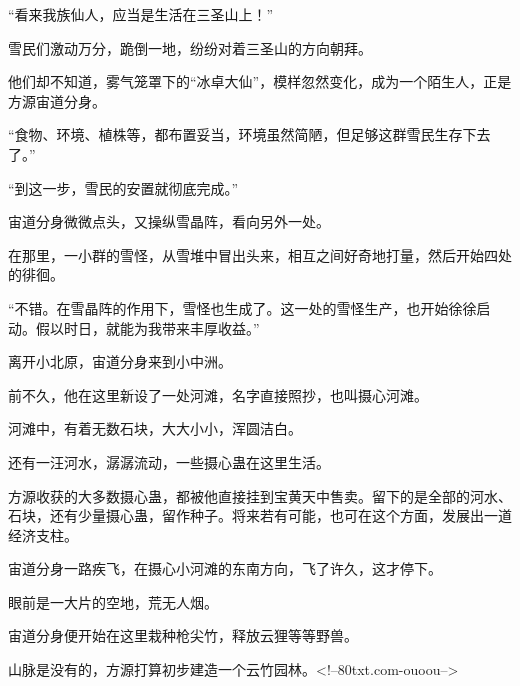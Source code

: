 \begin{this_body}
“看来我族仙人，应当是生活在三圣山上！”

雪民们激动万分，跪倒一地，纷纷对着三圣山的方向朝拜。

他们却不知道，雾气笼罩下的“冰卓大仙”，模样忽然变化，成为一个陌生人，正是方源宙道分身。

“食物、环境、植株等，都布置妥当，环境虽然简陋，但足够这群雪民生存下去了。”

“到这一步，雪民的安置就彻底完成。”

宙道分身微微点头，又操纵雪晶阵，看向另外一处。

在那里，一小群的雪怪，从雪堆中冒出头来，相互之间好奇地打量，然后开始四处的徘徊。

“不错。在雪晶阵的作用下，雪怪也生成了。这一处的雪怪生产，也开始徐徐启动。假以时日，就能为我带来丰厚收益。”

离开小北原，宙道分身来到小中洲。

前不久，他在这里新设了一处河滩，名字直接照抄，也叫摄心河滩。

河滩中，有着无数石块，大大小小，浑圆洁白。

还有一汪河水，潺潺流动，一些摄心蛊在这里生活。

方源收获的大多数摄心蛊，都被他直接挂到宝黄天中售卖。留下的是全部的河水、石块，还有少量摄心蛊，留作种子。将来若有可能，也可在这个方面，发展出一道经济支柱。

宙道分身一路疾飞，在摄心小河滩的东南方向，飞了许久，这才停下。

眼前是一大片的空地，荒无人烟。

宙道分身便开始在这里栽种枪尖竹，释放云狸等等野兽。

山脉是没有的，方源打算初步建造一个云竹园林。<!--80txt.com-ouoou-->

\end{this_body}

